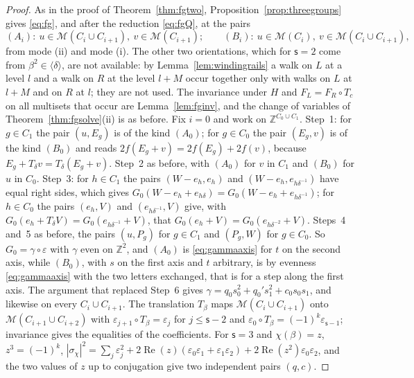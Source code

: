 \begin{proof}
As in the proof of Theorem~\ref{thm:fgtwo}, Proposition~\ref{prop:threegroups} gives \eqref{eq:fg}, and after the reduction \eqref{eq:fgQ}, at the pairs
\[
(A_i)\colon\ u\in\mathcal{M}(C_i\cup C_{i+1}),\ v\in\mathcal{M}(C_{i+1});\qquad (B_i)\colon\ u\in\mathcal{M}(C_i),\ v\in\mathcal{M}(C_i\cup C_{i+1}),
\]
from mode (ii) and mode (i). The other two orientations, which for $\mathsf{s}=2$ come from $\beta^{2}\in\langle\delta\rangle$, are not available: by Lemma~\ref{lem:windingrails} a walk on $L$ at a level $l$ and a walk on $R$ at the level $l+M$ occur together only with walks on $L$ at $l+M$ and on $R$ at $l$; they are not used. The invariance under $H$ and $F_L=F_R\circ T_c$ on all multisets that occur are Lemma~\ref{lem:fginv}, and the change of variables of Theorem~\ref{thm:fgsolve}(ii) is as before. Fix $i=0$ and work on $\mathbb{Z}^{C_0\cup C_1}$. Step~1: for $g\in C_1$ the pair $(u,E_g)$ is of the kind $(A_0)$; for $g\in C_0$ the pair $(E_g,v)$ is of the kind $(B_0)$ and reads $2f(E_g+v)=2f(E_g)+2f(v)$, because $E_g+T_\delta v=T_\delta(E_g+v)$. Step~2 as before, with $(A_0)$ for $v$ in $C_1$ and $(B_0)$ for $u$ in $C_0$. Step~3: for $h\in C_1$ the pairs $(W-e_h,e_h)$ and $(W-e_h,e_{h\delta^{-1}})$ have equal right sides, which gives $G_0(W-e_h+e_{h\delta})=G_0(W-e_h+e_{h\delta^{-1}})$; for $h\in C_0$ the pairs $(e_h,V)$ and $(e_{h\delta^{-1}},V)$ give, with $G_0(e_h+T_\delta V)=G_0(e_{h\delta^{-1}}+V)$, that $G_0(e_h+V)=G_0(e_{h\delta^{-2}}+V)$. Steps~4 and~5 as before, the pairs $(u,P_g)$ for $g\in C_1$ and $(P_g,W)$ for $g\in C_0$. So $G_0=\gamma\circ\varepsilon$ with $\gamma$ even on $\mathbb{Z}^{2}$, and $(A_0)$ is \eqref{eq:gammaaxis} for $t$ on the second axis, while $(B_0)$, with $s$ on the first axis and $t$ arbitrary, is by evenness \eqref{eq:gammaaxis} with the two letters exchanged, that is for a step along the first axis. The argument that replaced Step~6 gives $\gamma=q_0s_0^{2}+q_0's_1^{2}+c_0s_0s_1$, and likewise on every $C_i\cup C_{i+1}$. The translation $T_\beta$ maps $\mathcal{M}(C_i\cup C_{i+1})$ onto $\mathcal{M}(C_{i+1}\cup C_{i+2})$ with $\varepsilon_{j+1}\circ T_\beta=\varepsilon_j$ for $j\le\mathsf{s}-2$ and $\varepsilon_0\circ T_\beta=(-1)^{k}\varepsilon_{\mathsf{s}-1}$; invariance gives the equalities of the coefficients. For $\mathsf{s}=3$ and $\chi(\beta)=z$, $z^{3}=(-1)^{k}$, $|\sigma_\chi|^{2}=\sum_j\varepsilon_j^{2}+2\operatorname{Re}(z)(\varepsilon_0\varepsilon_1+\varepsilon_1\varepsilon_2)+2\operatorname{Re}(z^{2})\varepsilon_0\varepsilon_2$, and the two values of $z$ up to conjugation give two independent pairs $(q,c)$.
\end{proof}

